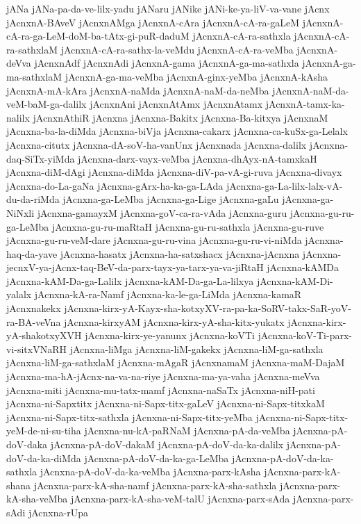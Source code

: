{jANa
jANa-pa-da-ve-lilx-yadu
jANaru
jANike
jANi-ke-ya-liV-va-vane
jAcnx
jAcnxnA-BAveV
jAcnxnAMga
jAcnxnA-cAra
jAcnxnA-cA-ra-gaLeM
jAcnxnA-cA-ra-ga-LeM-doM-ba-tAtx-gi-puR-daduM
jAcnxnA-cA-ra-sathxla
jAcnxnA-cA-ra-sathxlaM
jAcnxnA-cA-ra-sathx-la-veMdu
jAcnxnA-cA-ra-veMba
jAcnxnA-deVva
jAcnxnAdf
jAcnxnAdi
jAcnxnA-gama
jAcnxnA-ga-ma-sathxla
jAcnxnA-ga-ma-sathxlaM
jAcnxnA-ga-ma-veMba
jAcnxnA-ginx-yeMba
jAcnxnA-kAsha
jAcnxnA-mA-kAra
jAcnxnA-naMda
jAcnxnA-naM-da-neMba
jAcnxnA-naM-da-veM-baM-ga-dalilx
jAcnxnAni
jAcnxnAtAmx
jAcnxnAtamx
jAcnxnA-tamx-ka-nalilx
jAcnxnAthiR
jAcnxna
jAcnxna-Bakitx
jAcnxna-Ba-kitxya
jAcnxnaM
jAcnxna-ba-la-diMda
jAcnxna-biVja
jAcnxna-cakarx
jAcnxna-ca-kuSx-ga-Lelalx
jAcnxna-citutx
jAcnxna-dA-soV-ha-vanUnx
jAcnxnada
jAcnxna-dalilx
jAcnxna-daq-SiTx-yiMda
jAcnxna-darx-vayx-veMba
jAcnxna-dhAyx-nA-tamxkaH
jAcnxna-diM-dAgi
jAcnxna-diMda
jAcnxna-diV-pa-vA-gi-ruva
jAcnxna-divayx
jAcnxna-do-La-gaNa
jAcnxna-gArx-ha-ka-ga-LAda
jAcnxna-ga-La-lilx-lalx-vA-du-da-riMda
jAcnxna-ga-LeMba
jAcnxna-ga-Lige
jAcnxna-gaLu
jAcnxna-ga-NiNxli
jAcnxna-gamayxM
jAcnxna-goV-ca-ra-vAda
jAcnxna-guru
jAcnxna-gu-ru-ga-LeMba
jAcnxna-gu-ru-maRtaH
jAcnxna-gu-ru-sathxla
jAcnxna-gu-ruve
jAcnxna-gu-ru-veM-dare
jAcnxna-gu-ru-vina
jAcnxna-gu-ru-vi-niMda
jAcnxna-haq-da-yave
jAcnxna-hasatx
jAcnxna-ha-satxshacx
jAcnxna-jAcnxna
jAcnxna-jecnxV-ya-jAcnx-taq-BeV-da-parx-tayx-ya-tarx-ya-va-jiRtaH
jAcnxna-kAMDa
jAcnxna-kAM-Da-ga-Lalilx
jAcnxna-kAM-Da-ga-La-lilxya
jAcnxna-kAM-Di-yalalx
jAcnxna-kA-ra-Namf
jAcnxna-ka-le-ga-LiMda
jAcnxna-kamaR
jAcnxnakekx
jAcnxna-kirx-yA-Kayx-sha-kotxyXV-ra-pa-ka-SoRV-takx-SaR-yoV-ra-BA-veVna
jAcnxna-kirxyAM
jAcnxna-kirx-yA-sha-kitx-yukatx
jAcnxna-kirx-yA-shakotxyXVH
jAcnxna-kirx-ye-yanunx
jAcnxna-koVTi
jAcnxna-koV-Ti-parx-vi-sitxVNaRH
jAcnxna-liMga
jAcnxna-liM-gakekx
jAcnxna-liM-ga-sathxla
jAcnxna-liM-ga-sathxlaM
jAcnxna-mAgaR
jAcnxnamaM
jAcnxna-maM-DajaM
jAcnxna-ma-hA-jAcnx-na-va-na-riye
jAcnxna-ma-ya-vaha
jAcnxna-meVva
jAcnxna-miti
jAcnxna-mu-tatx-mamf
jAcnxna-naSaTx
jAcnxna-niH-pati
jAcnxna-ni-Sapxtitx
jAcnxna-ni-Sapx-titx-gaLeV
jAcnxna-ni-Sapx-titxkaM
jAcnxna-ni-Sapx-titx-sathxla
jAcnxna-ni-Sapx-titx-yeMba
jAcnxna-ni-Sapx-titx-yeM-de-ni-su-tiha
jAcnxna-nu-kA-paRNaM
jAcnxna-pA-da-veMba
jAcnxna-pA-doV-daka
jAcnxna-pA-doV-dakaM
jAcnxna-pA-doV-da-ka-dalilx
jAcnxna-pA-doV-da-ka-diMda
jAcnxna-pA-doV-da-ka-ga-LeMba
jAcnxna-pA-doV-da-ka-sathxla
jAcnxna-pA-doV-da-ka-veMba
jAcnxna-parx-kAsha
jAcnxna-parx-kA-shana
jAcnxna-parx-kA-sha-namf
jAcnxna-parx-kA-sha-sathxla
jAcnxna-parx-kA-sha-veMba
jAcnxna-parx-kA-sha-veM-talU
jAcnxna-parx-sAda
jAcnxna-parx-sAdi
jAcnxna-rUpa
}
